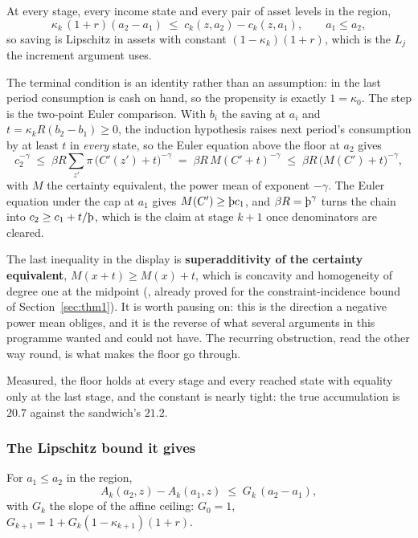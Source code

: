 \begin{theorem}\label{thm:mpcfloor}
At every stage, every income state and every pair of asset levels in the region,
\[
  \kappa_k\,(1+r)(a_2-a_1)\;\le\;c_k(z,a_2)-c_k(z,a_1),\qquad a_1\le a_2 ,
\]
so saving is Lipschitz in assets with constant $(1-\kappa_k)(1+r)$, which is the $L_j$ the increment
argument uses.
\end{theorem}

The terminal condition is an identity rather than an assumption: in the last period consumption is
cash on hand, so the propensity is exactly $1=\kappa_0$. The step is the two-point Euler comparison.
With $b_i$ the saving at $a_i$ and $t=\kappa_kR(b_2-b_1)\ge0$, the induction hypothesis raises next
period's consumption by at least $t$ in \emph{every} state, so the Euler equation above the floor at
$a_2$ gives
\[
  c_2^{-\gamma}\;\le\;\beta R\sum_{z'}\pi\,\bigl(C'(z')+t\bigr)^{-\gamma}
   \;=\;\beta R\,M(C'+t)^{-\gamma}\;\le\;\beta R\,\bigl(M(C')+t\bigr)^{-\gamma},
\]
with $M$ the certainty equivalent, the power mean of exponent $-\gamma$. The Euler equation under
the cap at $a_1$ gives $M(C')\ge\Thorn c_1$, and $\beta R=\Thorn^\gamma$ turns the chain into
$c_2\ge c_1+t/\Thorn$, which is the claim at stage $k+1$ once denominators are cleared.

The last inequality in the display is \textbf{superadditivity of the certainty equivalent},
$M(x+t)\ge M(x)+t$, which is concavity and homogeneity of degree one at the midpoint
(, already proved for the constraint-incidence bound of
Section~\ref{sec:thm1}). It is worth pausing on: this is the direction a negative power mean
obliges, and it is the reverse of what several arguments in this programme wanted and could not
have. The recurring obstruction, read the other way round, is what makes the floor go through.

Measured, the floor holds at every stage and every reached state with equality only at the last
stage, and the constant is nearly tight: the true accumulation is $20.7$ against the sandwich's
$21.2$.

\subsubsection*{The Lipschitz bound it gives}

\begin{theorem}\label{thm:cohortlip}
For $a_1\le a_2$ in the region,
\[
  A_k(a_2,z)-A_k(a_1,z)\;\le\;G_k\,(a_2-a_1),
\]
with $G_k$ the slope  of the affine ceiling: $G_0=1$,
$G_{k+1}=1+G_k(1-\kappa_{k+1})(1+r)$.
\end{theorem}

